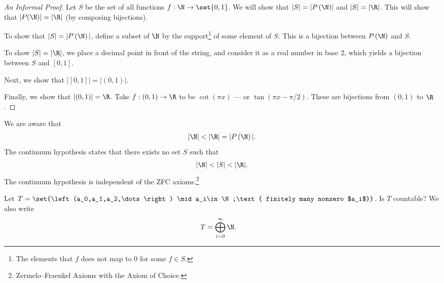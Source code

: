 \documentclass[10pt]{mypackage}
\begin{document}
\begin{proof}[An Informal Proof]
  Let $S$ be the set of all functions $f: \N\rightarrow \set{0,1}$. We will show that $|S| = \left\vert P\left(\N\right) \right\vert$ and $|S| = |\R|$. This will show that $\left\vert P(\N) \right\vert = \left\vert \R \right\vert$ (by composing bijections).\newline

  To show that $|S| = |P\left(\N\right)|$, define a subset of $\N$ by the support\footnote{The elements that $f$ does not map to $0$ for some $f\in S$.} of some element of $S$. This is a bijection between $P\left(\N\right)$ and $S$.\newline

  To show $|S| = |\R|$, we place a decimal point in front of the string, and consider it as a real number in base 2, which yields a bijection between $S$ and $[0,1]$.\newline

  Next, we show that $|[0,1]| = |(0,1)|$.\newline

  Finally, we show that $|(0,1)| = \R$. Take $f: (0,1)\rightarrow \R$ to be $\cot\left(\pi x\right)$ --- or $\tan(\pi x - \pi/2)$. These are bijections from $(0,1)$ to $\R$.
\end{proof}
\begin{definition}
  We are aware that
  \begin{align*}
    |\N| < |\R| = |P\left(\N\right)|.
  \end{align*}
  The continuum hypothesis states that there exists no set $S$ such that
  \begin{align*}
    |\N| < |S| < |\R|.
  \end{align*}
  The continuum hypothesis is independent of the ZFC axioms.\footnote{Zermelo--Fraenkel Axioms with the Axiom of Choice.}
\end{definition}
\begin{exercise}
  Let $T = \set{\left(a_0,a_1,a_2,\dots\right) \mid a_i\in \N;\text{ finitely many nonzero $a_i$}}$. Is $T$ countable? We also write 
  \begin{align*}
    T &= \bigoplus_{i=0}^{\infty}\N.
  \end{align*}
\end{exercise}
\end{document}
